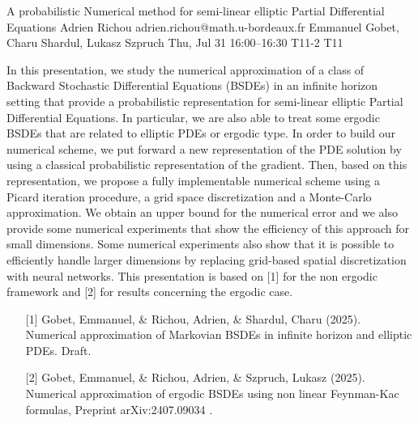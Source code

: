 \begin{talk}
  {A probabilistic Numerical method for semi-linear elliptic Partial Differential Equations}%
  {Adrien Richou}%
  {adrien.richou@math.u-bordeaux.fr}%
  {Emmanuel Gobet, Charu Shardul, Lukasz Szpruch}%
  {}%
  {}%
  {Thu, Jul 31 16:00–16:30}%
  {T11-2}%
  {T11}%
  
				
			
In this presentation, we study the numerical approximation of a class of Backward Stochastic Differential Equations (BSDEs) in an infinite horizon setting that provide a probabilistic representation for semi-linear elliptic Partial Differential Equations. In particular, we are also able to treat some ergodic BSDEs that are related to elliptic PDEs or ergodic type. In order to build our numerical scheme, we put forward a new representation of the PDE solution by using a classical probabilistic representation of the gradient. Then, based on this representation, we propose a fully implementable numerical scheme using a Picard iteration procedure, a grid space discretization and a Monte-Carlo approximation. We obtain an upper bound for the numerical error and we also provide some numerical experiments that show the
efficiency of this approach for small dimensions. Some numerical experiments also show that it is possible to efficiently handle larger dimensions by replacing grid-based spatial discretization with neural networks. This presentation is based on [1] for the non ergodic framework and [2] for results concerning the ergodic case.

\medskip

\begin{enumerate}
	\item[{[1]}] Gobet, Emmanuel, \& Richou, Adrien, \& Shardul, Charu (2025). Numerical approximation of Markovian BSDEs in infinite
  horizon and elliptic PDEs. Draft.
	\item[{[2]}] Gobet, Emmanuel, \& Richou, Adrien, \& Szpruch, Lukasz (2025).  Numerical approximation of ergodic BSDEs using non
  linear Feynman-Kac formulas, Preprint arXiv:2407.09034 .
\end{enumerate}

\end{talk}

